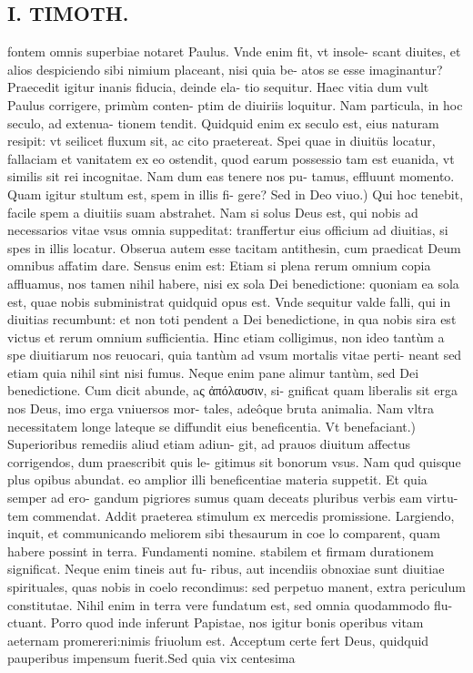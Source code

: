 \documentclass{article}
\begin{document}
\begin{pages}
\section*{I. TIMOTH. }
\marginpar{[ p.84 ]}\pstart fontem omnis superbiae notaret Paulus. Vnde enim fit, vt insole- scant diuites, et alios despiciendo sibi nimium placeant, nisi quia be- atos se esse imaginantur? Praecedit igitur inanis fiducia, deinde ela- tio sequitur. Haec vitia dum vult Paulus corrigere, primùm conten- ptim de diuiriis loquitur. Nam particula, in hoc seculo, ad extenua- tionem tendit. Quidquid enim ex seculo est, eius naturam resipit: vt seilicet fluxum sit, ac cito praetereat. Spei quae in diuitüs locatur, fallaciam et vanitatem ex eo ostendit, quod earum possessio tam est euanida, vt similis sit rei incognitae. Nam dum eas tenere nos pu- tamus, effluunt momento. Quam igitur stultum est, spem in illis fi- gere?  \pend\pstart Sed in Deo viuo.) Qui hoc tenebit, facile spem a diuitiis suam abstrahet. Nam si solus Deus est, qui nobis ad necessarios vitae vsus omnia suppeditat: tranffertur eius officium ad diuitias, si spes in illis locatur. Obserua autem esse tacitam antithesin, cum praedicat Deum omnibus affatim dare. Sensus enim est: Etiam si plena rerum omnium copia affluamus, nos tamen nihil habere, nisi ex sola Dei benedictione: quoniam ea sola est, quae nobis subministrat quidquid opus est. Vnde sequitur valde falli, qui in diuitias recumbunt: et non toti pendent a Dei benedictione, in qua nobis sira est victus et rerum omnium sufficientia. Hinc etiam colligimus, non ideo tantùm a spe diuitiarum nos reuocari, quia tantùm ad vsum mortalis vitae perti- neant sed etiam quia nihil sint nisi fumus. Neque enim pane alimur tantùm, sed Dei benedictione. Cum dicit abunde, aς ἀπόλαυσιν, si- gnificat quam liberalis sit erga nos Deus, imo erga vniuersos mor- tales, adeôque bruta animalia. Nam vltra necessitatem longe lateque se diffundit eius beneficentia.  \pend\pstart Vt benefaciant.) Superioribus remediis aliud etiam adiun- git, ad prauos diuitum affectus corrigendos, dum praescribit quis le- gitimus sit bonorum vsus. Nam qud quisque plus opibus abundat. eo amplior illi beneficentiae materia suppetit. Et quia semper ad ero- gandum pigriores sumus quam deceats pluribus verbis eam virtu- tem commendat. Addit praeterea stimulum ex mercedis promissione. Largiendo, inquit, et communicando meliorem sibi thesaurum in coe lo comparent, quam habere possint in terra. Fundamenti nomine. stabilem et firmam durationem significat. Neque enim tineis aut fu- ribus, aut incendiis obnoxiae sunt diuitiae spirituales, quas nobis in coelo recondimus: sed perpetuo manent, extra periculum constitutae. Nihil enim in terra vere fundatum est, sed omnia quodammodo flu- ctuant. Porro quod inde inferunt Papistae, nos igitur bonis operibus vitam aeternam promereri:nimis friuolum est. Acceptum certe fert Deus, quidquid pauperibus impensum fuerit.Sed quia vix centesima  \pend

\end{pages}
\end{document}
